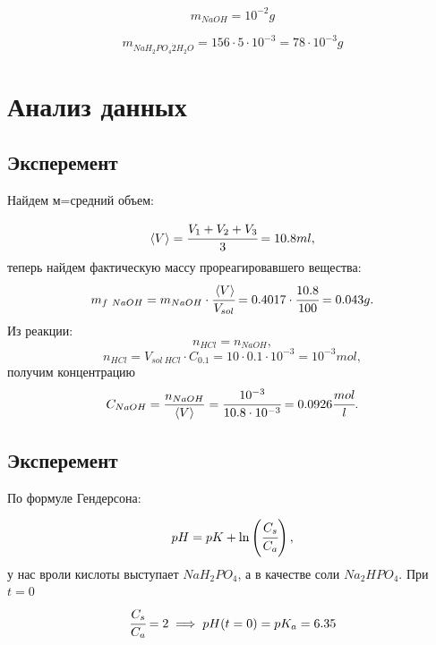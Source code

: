 \documentclass[a4paper]{article}
\newcommand{\inner}[1]{\left( #1 \right)}
\newcommand{\ave}[1]{\left\langle #1 \right\rangle}
\newcommand\tab[1][0.51cm]{\hspace*{#1}}
\numberwithin{equation}{section}
\begin{document}
\begin{equation} 
 m_{NaOH} = 10^{ - 2} g 
\end{equation} 
 
\begin{equation} 
 m_{NaH_2PO_4 \dot 2 H_2 O} = 156 \cdot 5 \cdot 10^{ - 3} = 
 78 \cdot 10^{ - 3} g  
\end{equation} 

\section{Анализ данных}

\subsection{Эксперемент}

\tab Найдем м=средний объем:

\begin{equation*} 
 \ave{V} = \cfrac{V_1 + V_2 + V_3}{3} = 10.8 ml,
\end{equation*} 
теперь найдем фактическую массу прореагировавшего вещества:
\begin{equation*} 
 m_{f \ NaOH} = m_{NaOH} \cdot \cfrac{\ave{V}}{V_{sol}} = 
  0.4017 \cdot \cfrac{10.8}{100}= 0.043 g.  
\end{equation*} 
Из реакции: 
\begin{equation*} 
 n_{HCl} = n_{NaOH},
\end{equation*} 
\begin{equation*} 
  n_{HCl} = V_{sol \ HCl} \cdot C_{0.1} = 
  10 \cdot 0.1 \cdot 10^{ - 3}
  = 10^{ - 3} mol,
\end{equation*} 
получим концентрацию
\begin{equation} 
  C_{NaOH} = \frac{n_{NaOH}}{\ave V} = 
  \cfrac{10^{ - 3}}{10.8 \cdot 10^{ - 3}} 
  = 0.0926 \cfrac{mol}{l}.
\end{equation} 


\subsection{Эксперемент}
\tab По формуле Гендерсона:

\begin{equation} 
  pH = pK + \ln \inner{\cfrac{C_{s}}{C_{a}}},
\end{equation} 
у нас вроли кислоты выступает $NaH_2PO_4$, а в качестве соли 
$Na_2HPO_4$. При $t = 0$ 
\begin{equation*} 
    \cfrac{C_{s}}{C_{a}} = 2 \implies pH(t = 0) = pK_{a} = 6.35
\end{equation*} 
\end{document}
